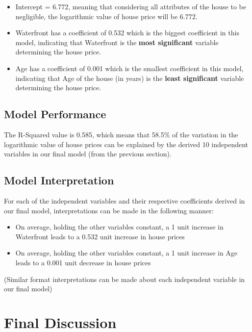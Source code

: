 \documentclass[letterpaper,9pt,twocolumn,twoside,]{pinp}
\providecommand{\tightlist}{%
  \setlength{\itemsep}{0pt}\setlength{\parskip}{0pt}}
\begin{document}
\begin{itemize}
\tightlist
\item
  Intercept = 6.772, meaning that considering all attributes of the
  house to be negligible, the logarithmic value of house price will be
  6.772.
\item
  Waterfront has a coefficient of 0.532 which is the biggest coefficient
  in this model, indicating that Waterfront is the \textbf{most
  significant} variable determining the house price.
\item
  Age has a coefficient of 0.001 which is the smallest coefficient in
  this model, indicating that Age of the house (in years) is the
  \textbf{least significant} variable determining the house price.
\end{itemize}

\hypertarget{model-performance}{%
\subsection{Model Performance}\label{model-performance}}

The R-Squared value is 0.585, which means that 58.5\% of the variation
in the logarithmic value of house prices can be explained by the derived
10 independent variables in our final model (from the previous section).

\hypertarget{model-interpretation}{%
\subsection{Model Interpretation}\label{model-interpretation}}

For each of the independent variables and their respective coefficients
derived in our final model, interpretations can be made in the following
manner:

\begin{itemize}
\tightlist
\item
  On average, holding the other variables constant, a 1 unit increase in
  Waterfront leads to a 0.532 unit increase in house prices
\item
  On average, holding the other variables constant, a 1 unit increase in
  Age leads to a 0.001 unit decrease in house prices
\end{itemize}

(Similar format interpretations can be made about each independent
variable in our final model)

\hypertarget{final-discussion}{%
\section{Final Discussion}\label{final-discussion}}
\end{document}
